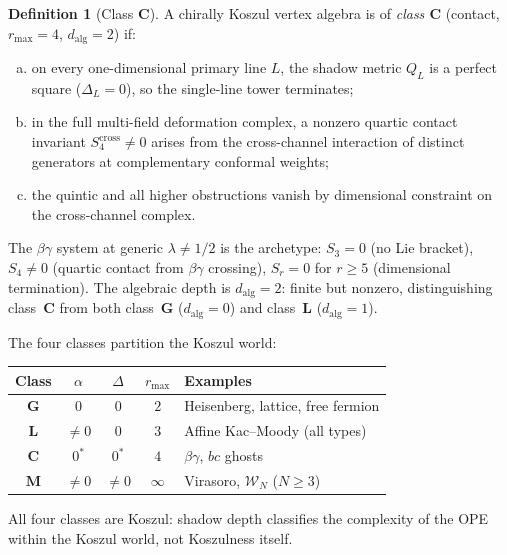 \documentclass[11pt,reqno]{amsart}
\theoremstyle{definition}
\newtheorem{definition}[theorem]{Definition}
\theoremstyle{remark}
\newcommand{\cW}{\mathcal{W}}
\numberwithin{equation}{section}
\begin{document}
\begin{definition}[Class $\mathbf{C}$]\label{def:class-C}
A chirally Koszul vertex algebra is of \emph{class
$\mathbf{C}$} (contact, $r_{\max} = 4$, $d_{\mathrm{alg}} = 2$)
if:
\begin{enumerate}[(a)]
\item on every one-dimensional primary line $L$, the shadow
 metric $Q_L$ is a perfect square ($\Delta_L = 0$), so
 the single-line tower terminates;
\item in the full multi-field deformation complex, a nonzero
 quartic contact invariant $S_4^{\mathrm{cross}} \ne 0$
 arises from the cross-channel interaction of distinct
 generators at complementary conformal weights;
\item the quintic and all higher obstructions vanish by
 dimensional constraint on the cross-channel complex.
\end{enumerate}
The $\beta\gamma$ system at generic $\lambda \ne 1/2$ is the
archetype: $S_3 = 0$ (no Lie bracket), $S_4 \ne 0$ (quartic
contact from $\beta\gamma$ crossing), $S_r = 0$ for $r \ge 5$
(dimensional termination). The algebraic depth is
$d_{\mathrm{alg}} = 2$: finite but nonzero, distinguishing
class~$\mathbf{C}$ from both class~$\mathbf{G}$
($d_{\mathrm{alg}} = 0$) and class~$\mathbf{L}$
($d_{\mathrm{alg}} = 1$).
\end{definition}

The four classes partition the Koszul world:

\begin{center}
\renewcommand{\arraystretch}{1.3}
\begin{tabular}{ccccl}
\toprule
Class & $\alpha$ & $\Delta$ & $r_{\max}$ & Examples \\
\midrule
$\mathbf{G}$ & $0$ & $0$ & $2$
 & Heisenberg, lattice, free fermion \\
$\mathbf{L}$ & $\ne 0$ & $0$ & $3$
 & Affine Kac--Moody (all types) \\
$\mathbf{C}$ & $0^*$ & $0^*$ & $4$
 & $\beta\gamma$, $bc$ ghosts \\
$\mathbf{M}$ & $\ne 0$ & $\ne 0$ & $\infty$
 & Virasoro, $\cW_N$ ($N \ge 3$) \\
\bottomrule
\end{tabular}
\end{center}

\noindent All four classes are Koszul: shadow depth classifies
the complexity of the OPE within the Koszul world, not
Koszulness itself.


\end{document}
